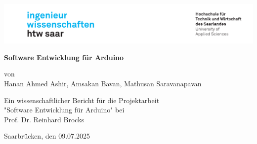 \begin{titlepage}

\linespread{1.5}

\includegraphics[width=\linewidth]{graphics/htw_logo}

\begin{center}
    \large  
    \hfill
    \vfill
    \Large{\bfseries{Software Entwicklung für Arduino}}
    
    von \\
    Hanan Ahmed Ashir, Amsakan Bavan, Mathusan Saravanapavan \\

    \vfill
		
    Ein wissenschaftlicher Bericht für die Projektarbeit \\
    "Software Entwicklung für Arduino" bei \\
    Prof. Dr. Reinhard Brocks
	
    \vfill	
    \vfill
	
    Saarbrücken, den 09.07.2025
\end{center}
    
\end{titlepage}
